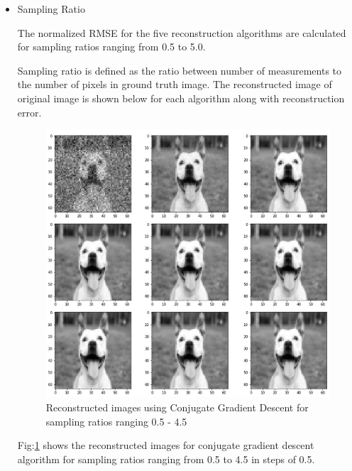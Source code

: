 \documentclass[conference]{IEEEtran}
\begin{document}
\begin{itemize}
    \item Sampling Ratio
    \medskip
    \par The normalized RMSE for the five reconstruction algorithms are calculated for sampling ratios ranging from 0.5 to 5.0. \par
	Sampling ratio is defined as the ratio between number of measurements to the number of pixels in ground truth image. The reconstructed image of original image is shown below for each algorithm along with reconstruction error.
        \begin{figure}[ht]
        \centering
        \includegraphics[scale=0.55]{figures/cgd_sampling_ratio.jpg}
        \caption{Reconstructed images using Conjugate Gradient Descent for sampling ratios ranging 0.5 - 4.5}
        \label{fig:cgd_sampling_ratio}
        \end{figure}
    \par Fig:\ref{fig:cgd_sampling_ratio} shows the reconstructed images for conjugate gradient descent algorithm for sampling ratios ranging from 0.5 to 4.5 in steps of 0.5.
    \begin{figure}[ht]
        \centering

\end{figure}
\end{itemize}
\end{document}
